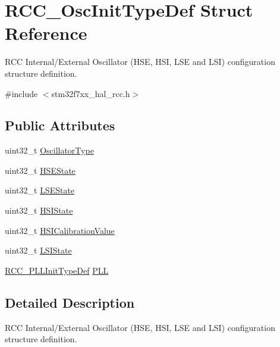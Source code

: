 \hypertarget{struct_r_c_c___osc_init_type_def}{}\section{R\+C\+C\+\_\+\+Osc\+Init\+Type\+Def Struct Reference}
\label{struct_r_c_c___osc_init_type_def}


R\+CC Internal/\+External Oscillator (H\+SE, H\+SI, L\+SE and L\+SI) configuration structure definition.  




{\ttfamily \#include $<$stm32f7xx\+\_\+hal\+\_\+rcc.\+h$>$}

\subsection*{Public Attributes}
\begin{DoxyCompactItemize}
\item 
uint32\+\_\+t \mbox{\hyperlink{struct_r_c_c___osc_init_type_def_af9e7bc89cab81c1705d94c74c7a81088}{Oscillator\+Type}}
\item 
uint32\+\_\+t \mbox{\hyperlink{struct_r_c_c___osc_init_type_def_a7e05d6eec98ed8cdaba00ca3d167ff72}{H\+S\+E\+State}}
\item 
uint32\+\_\+t \mbox{\hyperlink{struct_r_c_c___osc_init_type_def_a7c1294e9407e69e80fe034caf35fe7ea}{L\+S\+E\+State}}
\item 
uint32\+\_\+t \mbox{\hyperlink{struct_r_c_c___osc_init_type_def_a39b62cae65fe7a251000354e5bba8cb6}{H\+S\+I\+State}}
\item 
uint32\+\_\+t \mbox{\hyperlink{struct_r_c_c___osc_init_type_def_a9b2e48e452d0c334f2b9473216064560}{H\+S\+I\+Calibration\+Value}}
\item 
uint32\+\_\+t \mbox{\hyperlink{struct_r_c_c___osc_init_type_def_a955de90db8882fde02c4fb59c7c000f0}{L\+S\+I\+State}}
\item 
\mbox{\hyperlink{struct_r_c_c___p_l_l_init_type_def}{R\+C\+C\+\_\+\+P\+L\+L\+Init\+Type\+Def}} \mbox{\hyperlink{struct_r_c_c___osc_init_type_def_af76de5ee86798f0c3a4c83c84dfa58be}{P\+LL}}
\end{DoxyCompactItemize}


\subsection{Detailed Description}
R\+CC Internal/\+External Oscillator (H\+SE, H\+SI, L\+SE and L\+SI) configuration structure definition. 



